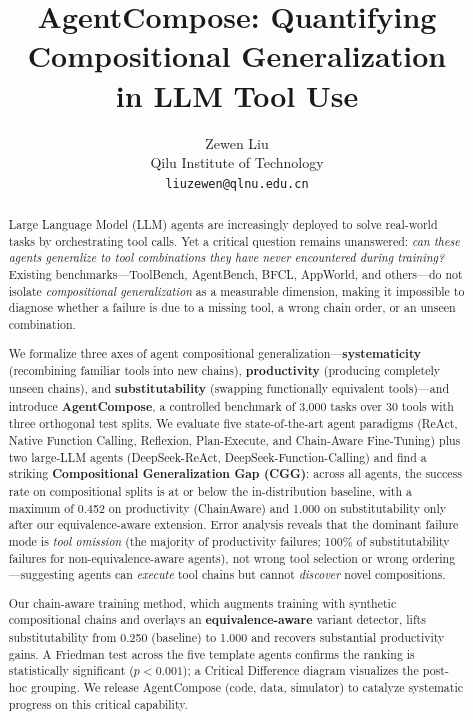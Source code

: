 \documentclass[10pt]{article}
\title{AgentCompose: Quantifying Compositional Generalization \\ in LLM Tool Use}
\author{Zewen Liu \\ Qilu Institute of Technology \\ \texttt{liuzewen@qlnu.edu.cn}}
\date{}
\begin{document}
\maketitle

\begin{abstract}
Large Language Model (LLM) agents are increasingly deployed to solve real-world tasks by orchestrating tool calls. Yet a critical question remains unanswered: \emph{can these agents generalize to tool combinations they have never encountered during training?} Existing benchmarks---ToolBench, AgentBench, BFCL, AppWorld, and others---do not isolate \emph{compositional generalization} as a measurable dimension, making it impossible to diagnose whether a failure is due to a missing tool, a wrong chain order, or an unseen combination.

We formalize three axes of agent compositional generalization---{\bf systematicity} (recombining familiar tools into new chains), {\bf productivity} (producing completely unseen chains), and {\bf substitutability} (swapping functionally equivalent tools)---and introduce {\bf AgentCompose}, a controlled benchmark of 3{,}000 tasks over 30 tools with three orthogonal test splits. We evaluate five state-of-the-art agent paradigms (ReAct, Native Function Calling, Reflexion, Plan-Execute, and Chain-Aware Fine-Tuning) plus two large-LLM agents (DeepSeek-ReAct, DeepSeek-Function-Calling) and find a striking {\bf Compositional Generalization Gap (CGG)}: across all agents, the success rate on compositional splits is at or below the in-distribution baseline, with a maximum of 0.452 on productivity (ChainAware) and 1.000 on substitutability only after our equivalence-aware extension. Error analysis reveals that the dominant failure mode is \emph{tool omission} (the majority of productivity failures; 100\% of substitutability failures for non-equivalence-aware agents), not wrong tool selection or wrong ordering---suggesting agents can \emph{execute} tool chains but cannot \emph{discover} novel compositions.

Our chain-aware training method, which augments training with synthetic compositional chains and overlays an {\bf equivalence-aware} variant detector, lifts substitutability from 0.250 (baseline) to 1.000 and recovers substantial productivity gains. A Friedman test across the five template agents confirms the ranking is statistically significant ($p < 0.001$); a Critical Difference diagram visualizes the post-hoc grouping. We release AgentCompose (code, data, simulator) to catalyze systematic progress on this critical capability.
\end{abstract}
\end{document}
